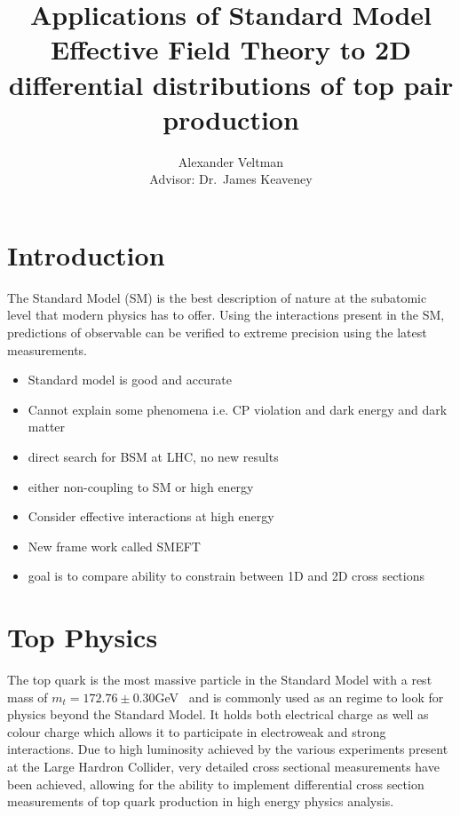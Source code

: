 \documentclass[a4paper,11pt]{article}
\title{Applications of Standard Model Effective Field Theory to 2D differential distributions of top pair production}
\author{Alexander Veltman\\{\small Advisor: Dr.\ James Keaveney}}
\affil{Department of Physics,\\University of Cape Town}
\begin{document}
\maketitle

\begin{abstract}
\end{abstract}

\section{Introduction}

The Standard Model (SM) is the best description of nature at the subatomic level that modern physics has to offer.
Using the interactions present in the SM, predictions of observable can be verified to extreme precision using the latest measurements.

\begin{itemize}
    \item Standard model is good and accurate
    \item Cannot explain some phenomena i.e. CP violation and dark energy and dark matter
    \item direct search for BSM at LHC, no new results
    \item either non-coupling to SM or high energy
    \item Consider effective interactions at high energy
    \item New frame work called SMEFT
    \item goal is to compare ability to constrain between 1D and 2D cross sections
\end{itemize}


\section{Top Physics}

The top quark is the most massive particle in the Standard Model with a rest mass of $m_{t} =172.76\pm0.30$GeV~\cite{ParticleDataGroup:2020ssz} and is commonly used as an regime to look for physics beyond the Standard Model.
It holds both electrical charge as well as colour charge which allows it to participate in electroweak and strong interactions.
Due to high luminosity achieved by the various experiments present at the Large Hardron Collider, very detailed cross sectional measurements have been achieved, allowing for the ability to implement differential cross section measurements of top quark production in high energy physics analysis.
\end{document}
